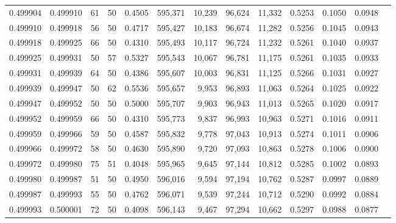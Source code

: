 \begin{tabular}{rrrrrrrrrrrrr}
0.499904 & 0.499910 &    61 &  50 &                                     0.4505 & 595,371 &  10,239 &  96,624 &  11,332 & 0.5253 & 0.1050 & 0.0948 \\
0.499910 & 0.499918 &    56 &  50 &                                     0.4717 & 595,427 &  10,183 &  96,674 &  11,282 & 0.5256 & 0.1045 & 0.0943 \\
0.499918 & 0.499925 &    66 &  50 &                                     0.4310 & 595,493 &  10,117 &  96,724 &  11,232 & 0.5261 & 0.1040 & 0.0937 \\
0.499925 & 0.499931 &    50 &  57 &                                     0.5327 & 595,543 &  10,067 &  96,781 &  11,175 & 0.5261 & 0.1035 & 0.0933 \\
0.499931 & 0.499939 &    64 &  50 &                                     0.4386 & 595,607 &  10,003 &  96,831 &  11,125 & 0.5266 & 0.1031 & 0.0927 \\
0.499939 & 0.499947 &    50 &  62 &                                     0.5536 & 595,657 &   9,953 &  96,893 &  11,063 & 0.5264 & 0.1025 & 0.0922 \\
0.499947 & 0.499952 &    50 &  50 &                                     0.5000 & 595,707 &   9,903 &  96,943 &  11,013 & 0.5265 & 0.1020 & 0.0917 \\
0.499952 & 0.499959 &    66 &  50 &                                     0.4310 & 595,773 &   9,837 &  96,993 &  10,963 & 0.5271 & 0.1016 & 0.0911 \\
0.499959 & 0.499966 &    59 &  50 &                                     0.4587 & 595,832 &   9,778 &  97,043 &  10,913 & 0.5274 & 0.1011 & 0.0906 \\
0.499966 & 0.499972 &    58 &  50 &                                     0.4630 & 595,890 &   9,720 &  97,093 &  10,863 & 0.5278 & 0.1006 & 0.0900 \\
0.499972 & 0.499980 &    75 &  51 &                                     0.4048 & 595,965 &   9,645 &  97,144 &  10,812 & 0.5285 & 0.1002 & 0.0893 \\
0.499980 & 0.499987 &    51 &  50 &                                     0.4950 & 596,016 &   9,594 &  97,194 &  10,762 & 0.5287 & 0.0997 & 0.0889 \\
0.499987 & 0.499993 &    55 &  50 &                                     0.4762 & 596,071 &   9,539 &  97,244 &  10,712 & 0.5290 & 0.0992 & 0.0884 \\
0.499993 & 0.500001 &    72 &  50 &                                     0.4098 & 596,143 &   9,467 &  97,294 &  10,662 & 0.5297 & 0.0988 & 0.0877 \\

\end{tabular}
